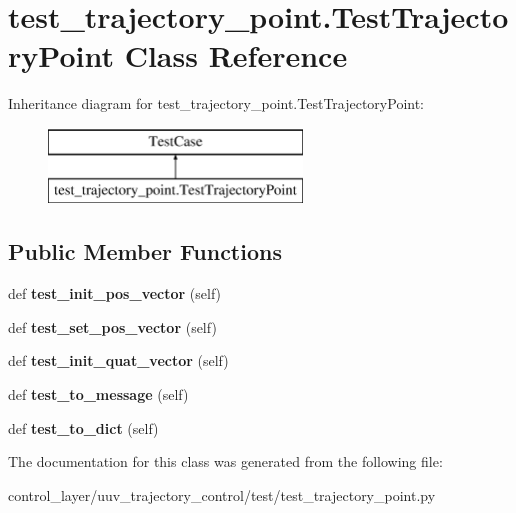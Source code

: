 \hypertarget{classtest__trajectory__point_1_1TestTrajectoryPoint}{}\section{test\+\_\+trajectory\+\_\+point.\+Test\+Trajectory\+Point Class Reference}
\label{classtest__trajectory__point_1_1TestTrajectoryPoint}
Inheritance diagram for test\+\_\+trajectory\+\_\+point.\+Test\+Trajectory\+Point\+:\begin{figure}[H]
\begin{center}
\leavevmode
\includegraphics[height=2.000000cm]{classtest__trajectory__point_1_1TestTrajectoryPoint}
\end{center}
\end{figure}
\subsection*{Public Member Functions}
\begin{DoxyCompactItemize}
\item 
\mbox{\label{classtest__trajectory__point_1_1TestTrajectoryPoint_ac78eb9828d96f3ef794a4a71debfb447}} 
def {\bfseries test\+\_\+init\+\_\+pos\+\_\+vector} (self)
\item 
\mbox{\label{classtest__trajectory__point_1_1TestTrajectoryPoint_a90a11626e626cdea3657b7dcc922d140}} 
def {\bfseries test\+\_\+set\+\_\+pos\+\_\+vector} (self)
\item 
\mbox{\label{classtest__trajectory__point_1_1TestTrajectoryPoint_aedc11ee91411b53189d7dfc90be37ae5}} 
def {\bfseries test\+\_\+init\+\_\+quat\+\_\+vector} (self)
\item 
\mbox{\label{classtest__trajectory__point_1_1TestTrajectoryPoint_a4c2ea5d443d4d97f59cd8925e3f8f43c}} 
def {\bfseries test\+\_\+to\+\_\+message} (self)
\item 
\mbox{\label{classtest__trajectory__point_1_1TestTrajectoryPoint_af3435fc74dbf802f766067c225632465}} 
def {\bfseries test\+\_\+to\+\_\+dict} (self)
\end{DoxyCompactItemize}


The documentation for this class was generated from the following file\+:\begin{DoxyCompactItemize}
\item 
control\+\_\+layer/uuv\+\_\+trajectory\+\_\+control/test/test\+\_\+trajectory\+\_\+point.\+py\end{DoxyCompactItemize}
